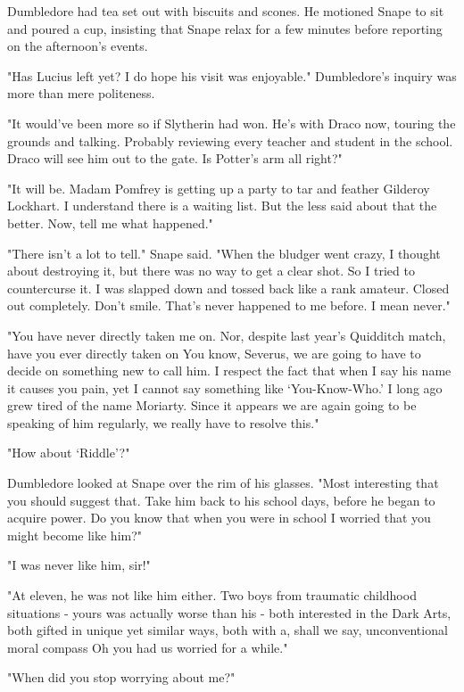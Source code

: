\sbreak

Dumbledore had tea set out with biscuits and scones. He motioned Snape to sit and poured a cup, insisting that Snape relax for a few minutes before reporting on the afternoon's events.

"Has Lucius left yet? I do hope his visit was enjoyable." Dumbledore's inquiry was more than mere politeness.

"It would've been more so if Slytherin had won. He's with Draco now, touring the grounds and talking. Probably reviewing every teacher and student in the school. Draco will see him out to the gate. Is Potter's arm all right?"

"It will be. Madam Pomfrey is getting up a party to tar and feather Gilderoy Lockhart. I understand there is a waiting list. But the less said about that the better. Now, tell me what happened."

"There isn't a lot to tell." Snape said. "When the bludger went crazy, I thought about destroying it, but there was no way to get a clear shot. So I tried to countercurse it. I was slapped down and tossed back like a rank amateur. Closed out completely. Don't smile. That's never happened to me before. I mean never."

"You have never directly taken me on. Nor, despite last year's Quidditch match, have you ever directly taken on{\el} You know, Severus, we are going to have to decide on something new to call him. I respect the fact that when I say his name it causes you pain, yet I cannot say something like `You-Know-Who.' I long ago grew tired of the name Moriarty. Since it appears we are again going to be speaking of him regularly, we really have to resolve this."

"How about `Riddle'?"

Dumbledore looked at Snape over the rim of his glasses. "Most interesting that you should suggest that. Take him back to his school days, before he began to acquire power. Do you know that when you were in school I worried that you might become like him?"

"I was never like him, sir!"

"At eleven, he was not like him either. Two boys from traumatic childhood situations - yours was actually worse than his - both interested in the Dark Arts, both gifted in unique yet similar ways, both with a, shall we say, unconventional moral compass{\el} Oh you had us worried for a while."

"When did you stop worrying about me?"

